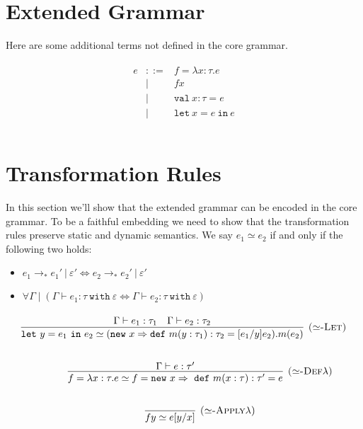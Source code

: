 \documentclass{llncs}
\newcommand{\keywadj}[1]{\mathtt{#1}}
\newcommand{\keyw}[1]{\keywadj{#1}~}
\begin{document}
\section{Extended Grammar}

Here are some additional terms not defined in the core grammar.

\[
\begin{array}{lll}
\begin{array}{lllr}

	e & ::= & f = \lambda x : \tau . e\\
  		& | & f x\\
  		& | & \keyw{val} x : \tau = e\\
  		& | & \keyw{let} x = e~\keyw{in} e\\
		&&\\
\end{array}
\end{array}
\]



\section{Transformation Rules}

In this section we'll show that the extended grammar can be encoded in the core grammar. To be a faithful embedding we need to show that the transformation rules preserve static and dynamic semantics. We say $e_1 \simeq e_2$ if and only if the following two holds:
\begin{itemize}
	\item $e_1 \longrightarrow_* e_1'~|~\varepsilon'
				\iff
				 e_2 \longrightarrow_* e_2'~|~\varepsilon'$
	\item $\forall \Gamma \mid (\Gamma \vdash e_1 : \tau~\keyw{with} \varepsilon \iff \Gamma \vdash e_2 : \tau~\keyw{with} \varepsilon)$
\end{itemize}

\paragraph{}


\[
\begin{array}{c}
	
\infer[\textsc{($\simeq$-Let)}]
	{\keyw{let} y = e_1~\keyw{in} e_2 \simeq (\keyw{new} x \Rightarrow \keyw{def} m(y: \tau_1) : \tau_2 = [e_1/y]e_2).m(e_2)}
	{\Gamma \vdash e_1 : \tau_1 & \Gamma \vdash e_2 : \tau_2}  \\[5ex]
~~~~~~~~~~
\infer[\textsc{($\simeq$-Def$\lambda$)}]
	{f = \lambda x : \tau . e \simeq f = \keyw{new} x \Rightarrow~\keyw{def} m(x : \tau) : \tau' = e}
	{\Gamma \vdash e : \tau'}\\[5ex]
~~~~~~~~~~
\infer[\textsc{($\simeq$-Apply$\lambda$)}] 
	{f y \simeq e[y/x] }
	{} \\[5ex]
~~~~~~~~~~

  
\end{array}
\]	
\end{document}
